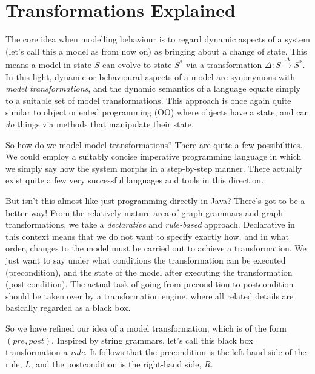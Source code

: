 \genHeader
\section{Transformations Explained}
\hypertarget{explanation}{}

The core idea when modelling behaviour is to regard dynamic aspects of a system (let's call this a model as from now on) as bringing about a change of state.
This means a model in state $S$ can evolve to state $S^*$ via a transformation $\Delta: S \stackrel{\Delta}{\rightarrow}S^*$. In this light, dynamic or
behavioural aspects of a model are synonymous with \emph{model transformations}, and the dynamic semantics of a language equate simply to a suitable set of
model transformations. This approach is once again quite similar to object oriented programming (OO) where objects have a state, and can \emph{do} things via 
methods that manipulate their state.

So how do we model model transformations?  There are quite a few possibilities. We could employ a suitably concise imperative programming language in which we
simply say how the system morphs in a step-by-step manner. There actually exist quite a few very successful languages and tools in this direction.

But isn't this almost like just programming directly in Java? There's got to be a better way! From the relatively mature area of graph grammars and
graph transformations, we take a \emph{declarative} and \emph{rule-based} approach. Declarative in this context means that we do not want to specify exactly 
how, and in what order, changes to the model must be carried out to achieve a transformation. We just want to say under what conditions the transformation can 
be executed (precondition), and the state of the model after executing the transformation (post condition). The actual task of going from precondition to
postcondition should be taken over by a transformation engine, where all related details are basically regarded as a black box.

So we have refined our idea of a model transformation, which is of the form $(pre, post)$.  Inspired by string grammars, let's call this black box
transformation a \emph{rule}. It follows that the precondition is the left-hand side of the rule, $L$, and the postcondition is the right-hand side, $R$.

